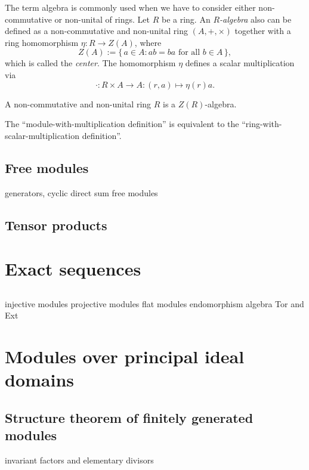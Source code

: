 \documentclass{../../large}
\begin{document}
\begin{prb}
The term algebra is commonly used when we have to consider either non-commutative or non-unital of rings.
Let $R$ be a ring.
An \emph{$R$-algebra} also can be defined as a non-commutative and non-unital ring $(A,+,\times)$ together with a ring homomorphism $\eta:R\to Z(A)$, where
\[Z(A):=\{\,a\in A:ab=ba\text{ for all }b\in A\,\},\]
which is called the \emph{center}.
The homomorphism $\eta$ defines a scalar multiplication via
\[\cdot:R\times A\to A:(r,a)\mapsto\eta(r)a.\]
\begin{parts}
\item A non-commutative and non-unital ring $R$ is a $Z(R)$-algebra.
\item The ``module-with-multiplication definition'' is equivalent to the ``ring-with-scalar-multiplication definition''.
\end{parts}
\end{prb}


\section{Free modules}
generators, cyclic
direct sum
free modules

\section{Tensor products}





\chapter{Exact sequences}
\section{}
injective modules
projective modules
flat modules
endomorphism algebra
Tor and Ext






\chapter{Modules over principal ideal domains}
\section{Structure theorem of finitely generated modules}
invariant factors and elementary divisors
\end{document}
